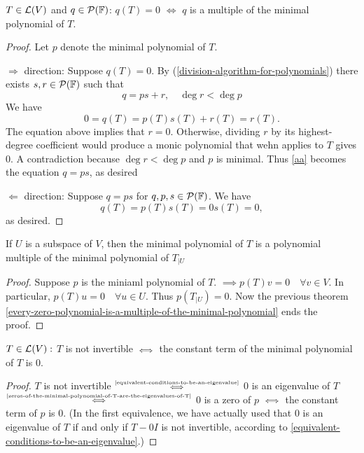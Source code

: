 \setcounter{thm}{28}
\begin{thm}
    \label{every-zero-polynomial-is-a-multiple-of-the-minimal-polynomial}
    $T\in \mathcal{L}(V)$ and $q \in \mathcal{P} (\mathbb{F})$: $q(T)=0$ $\iff$ $q$ is a multiple of the minimal polynomial of $T$.
\end{thm}
\begin{proof}
    Let $p$ denote the minimal polynomial of $T$.
    
    $\Rightarrow$ direction: Suppose $q(T)=0$.
    By (\ref{division-algorithm-for-polynomials}) there exists $s,r \in \mathcal{P} (\mathbb{F})$ such that
    \begin{equation}
        q=ps+r, \quad \deg r < \deg p
    \end{equation}
    We have                                     
    \begin{equation}
        \label{aa}
        0 = q(T) = p(T)s(T) + r(T) = r(T).
    \end{equation}
    The equation above implies that $r=0$. Otherwise, dividing $r$ by its highest-degree coefficient would produce a monic polynomial that wehn applies to $T$ gives $0$. A contradiction because $\deg r < \deg p$ and $p$ is minimal. Thus \ref{aa} becomes the equation $q=ps$, as desired
    
    $\Leftarrow$ direction: Suppose $q=ps$ for $q,p,s \in \mathcal{P}(\mathbb{F})$. We have
    \begin{equation}
        q(T) = p(T)s(T)=0s(T)=0,
    \end{equation}
    as desired.
\end{proof}

\setcounter{thm}{30}
\begin{thm}
    \label{minimal-polynomial-of-a-restriction-operator}
    If $U$ is a subspace of $V$, then the minimal polynomial of $T$ is a polynomial multiple of the minimal polynomial of $T_{|U}$
\end{thm}
\begin{proof}
    Suppose $p$ is the miniaml polynomial of $T$. $\implies p(T)v=0 \quad \forall v \in V$. In particular, $p(T)u=0 \quad \forall u\in U$. Thus $p(T_{|U})=0.$ Now the previous theorem
    \ref{every-zero-polynomial-is-a-multiple-of-the-minimal-polynomial} ends the proof.
\end{proof}

\begin{thm}
    $T \in \mathcal{L} (V):$ $T$ is not invertible $\mathsmaller{\iff}$ the constant term of the minimal polynomial of $T$ is $0$.
\end{thm}
\begin{proof}
    $T$ is not invertible $\mathsmaller{\overset{\text{\ref{equivalent-conditions-to-be-an-eigenvalue}}}{\iff}}$ $0$ is an eigenvalue of $T$ $\mathsmaller{\overset{\text{\ref{zeros-of-the-minimal-polynomial-of-T-are-the-eigenvalues-of-T}}}{\iff}}$ $0$ is a zero of $p$ $\mathsmaller{\iff}$ the constant term of $p$ is $0$.
    (In the first equivalence, we have actually used that $0$ is an eigenvalue of $T$ if and only if $T-0I$ is not invertible, according to \ref{equivalent-conditions-to-be-an-eigenvalue}.)
\end{proof}

